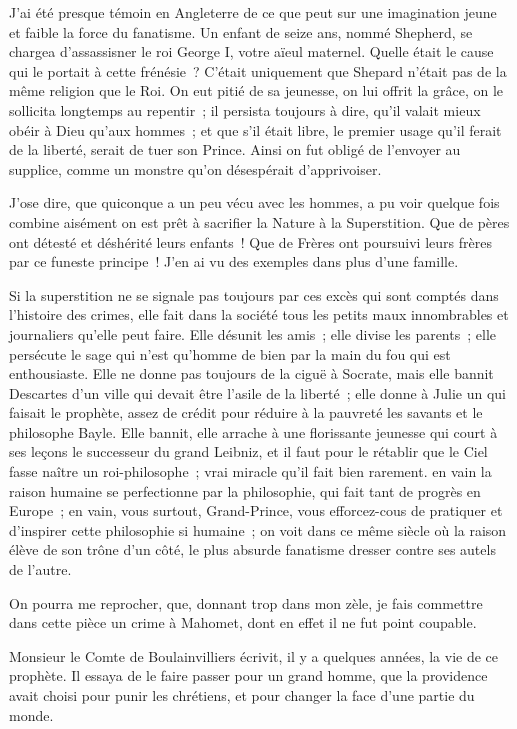 \documentclass[french,twoside]{book} %
\begin{document}
J’ai été presque témoin en Angleterre de ce que peut sur une imagination jeune et faible la force du fanatisme. Un enfant de seize ans, nommé Shepherd, se chargea d’assassisner le roi George I, votre aïeul maternel. Quelle était le cause qui le portait à cette frénésie ? C’était uniquement que Shepard n’était pas de la même religion que le Roi. On eut pitié de sa jeunesse, on lui offrit la grâce, on le sollicita longtemps au repentir ; il persista toujours à dire, qu’il valait mieux obéir à Dieu qu’aux hommes ; et que s’il était libre, le premier usage qu’il ferait de la liberté, serait de tuer son Prince. Ainsi on fut obligé de l’envoyer au supplice, comme un monstre qu’on désespérait d’apprivoiser.\par
J’ose dire, que quiconque a un peu vécu avec les hommes, a pu voir quelque fois combine aisément on est prêt à sacrifier la Nature à la Superstition. Que de pères ont détesté et déshérité leurs enfants ! Que de Frères ont poursuivi leurs frères par ce funeste principe ! J’en ai vu des exemples dans plus d’une famille.\par
Si la superstition ne se signale pas toujours par ces excès qui sont comptés dans l’histoire des crimes, elle fait dans la société tous les petits maux innombrables et journaliers qu’elle peut faire. Elle désunit les amis ; elle divise les parents ; elle persécute le sage qui n’est qu’homme de bien par la main du fou qui est enthousiaste. Elle ne donne pas toujours de la ciguë à Socrate, mais elle bannit Descartes d’un ville qui devait être l’asile de la liberté ; elle donne à Julie un qui faisait le prophète, assez de crédit pour réduire à la pauvreté les savants et le philosophe Bayle. Elle bannit, elle arrache à une florissante jeunesse qui court à ses leçons le successeur du grand Leibniz, et il faut pour le rétablir que le Ciel fasse naître un roi-philosophe ; vrai miracle qu’il fait bien rarement. en vain la raison humaine se perfectionne par la philosophie, qui fait tant de progrès en Europe ; en vain, vous surtout, Grand-Prince, vous efforcez-cous de pratiquer et d’inspirer cette philosophie si humaine ; on voit dans ce même siècle où la raison élève de son trône d’un côté, le plus absurde fanatisme dresser contre ses autels de l’autre.\par
On pourra me reprocher, que, donnant trop dans mon zèle, je fais commettre dans cette pièce un crime à Mahomet, dont en effet il ne fut point coupable.\par
Monsieur le Comte de Boulainvilliers écrivit, il y a quelques années, la vie de ce prophète. Il essaya de le faire passer pour un grand homme, que la providence avait choisi pour punir les chrétiens, et pour changer la face d’une partie du monde.\par
\end{document}
